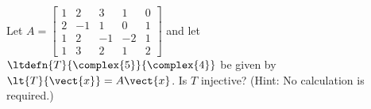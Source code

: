 Let 
$A = 
\begin{bmatrix}  
1 & 2 & 3 & 1 & 0\\ 
2 & -1 & 1 & 0 & 1\\ 
1 & 2 & -1 & -2 & 1\\ 
1 & 3 & 2 & 1 & 2
\end{bmatrix}$ 
and let 
$\ltdefn{T}{\complex{5}}{\complex{4}}$ be given by 
$\lt{T}{\vect{x}}=A\vect{x}$.  
Is $T$ injective?  (Hint:  No calculation is required.)


